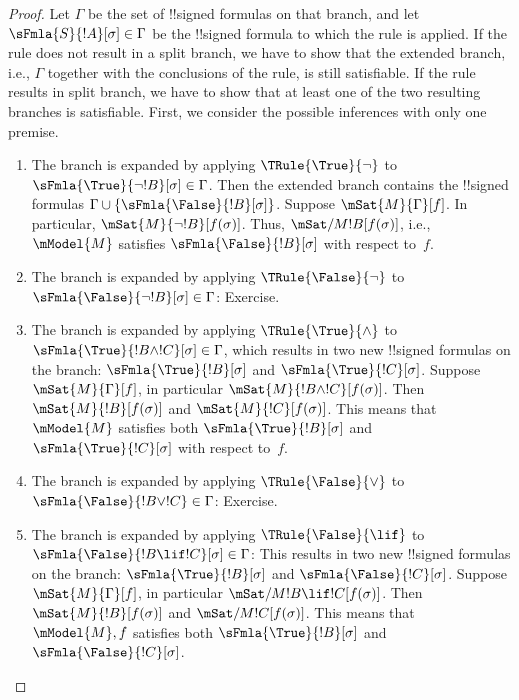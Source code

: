 \documentclass[../../../include/open-logic-section]{subfiles}
\begin{document}
\begin{proof}
Let $\Gamma$ be the set of !!{signed formula}s on that branch, and let
$\sFmla{S}{!A}[\sigma] \in \Gamma$ be the !!{signed formula} to which
the rule is applied. If the rule does not result in a split branch, we
have to show that the extended branch, i.e., $\Gamma$ together with
the conclusions of the rule, is still satisfiable. If the rule results
in split branch, we have to show that at least one of the two
resulting branches is satisfiable.
First, we consider the possible inferences with only one premise.
\begin{enumerate}
\item The branch is expanded by applying $\TRule{\True}{\lnot}$ to
  $\sFmla{\True}{\lnot !B}[\sigma] \in \Gamma$. Then the extended
  branch contains the !!{signed formula}s $\Gamma \cup
  \{\sFmla{\False}{!B}[\sigma]\}$.  Suppose $\mSat{M}{\Gamma}[f]$. In
  particular, $\mSat{M}{\lnot !B}[f(\sigma)]$. Thus,
  $\mSat/{M}{!B}[f(\sigma)]$, i.e., $\mModel{M}$ satisfies
  $\sFmla{\False}{!B}[\sigma]$ with respect to~$f$.
\item The branch is expanded by applying $\TRule{\False}{\lnot}$ to
  $\sFmla{\False}{\lnot !B}[\sigma] \in \Gamma$: Exercise.
\item The branch is expanded by applying $\TRule{\True}{\land}$ to
  $\sFmla{\True}{!B \land !C}[\sigma] \in \Gamma$, which results in
  two new !!{signed formula}s on the branch:
  $\sFmla{\True}{!B}[\sigma]$ and $\sFmla{\True}{!C}[\sigma]$. Suppose
  $\mSat{M}{\Gamma}[f]$, in particular $\mSat{M}{!B \land
    !C}[f(\sigma)]$. Then $\mSat{M}{!B}[f(\sigma)]$ and
  $\mSat{M}{!C}[f(\sigma)]$. This means that $\mModel{M}$ satisfies
  both $\sFmla{\True}{!B}[\sigma]$ and $\sFmla{\True}{!C}[\sigma]$
  with respect to~$f$.
\item The branch is expanded by applying $\TRule{\False}{\lor}$ to
  $\sFmla{\False}{!B \lor !C} \in \Gamma$: Exercise.
\item The branch is expanded by applying $\TRule{\False}{\lif}$ to
  $\sFmla{\False}{!B \lif !C}[\sigma] \in \Gamma$: This results in two
  new !!{signed formula}s on the branch: $\sFmla{\True}{!B}[\sigma]$ and
  $\sFmla{\False}{!C}[\sigma]$. Suppose
  $\mSat{M}{\Gamma}[f]$, in particular
  $\mSat/{M}{!B \lif !C}[f(\sigma)]$. Then
  $\mSat{M}{!B}[f(\sigma)]$ and
  $\mSat/{M}{!C}[f(\sigma)]$. This means that
  $\mModel{M}, f$ satisfies both
  $\sFmla{\True}{!B}[\sigma]$ and $\sFmla{\False}{!C}[\sigma]$.

\end{enumerate}
\end{proof}
\end{document}
